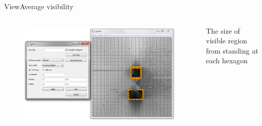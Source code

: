 \begin{frame}{View}{Average visibility}

\begin{columns}
\begin{figure}
\centering
\includegraphics[width = \textwidth]{./screenshot/average_visibility_view.png}
\end{figure}

\begin{minipage}{\textwidth}
The size of visible region from standing at each hexagon
\end{minipage}
\end{columns}

\end{frame}

